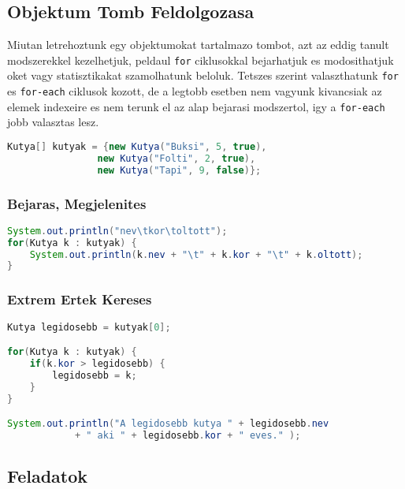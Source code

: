 \documentclass{article}
\let\l\lstinline
\begin{document}
\newpage

\subsection{Objektum Tomb Feldolgozasa}

Miutan letrehoztunk egy objektumokat tartalmazo tombot, azt az eddig tanult modszerekkel kezelhetjuk, peldaul \l{for}
ciklusokkal bejarhatjuk es modosithatjuk oket vagy statisztikakat szamolhatunk beloluk. Tetszes szerint valaszthatunk
\l{for} es \l{for-each} ciklusok kozott, de a legtobb esetben nem vagyunk kivancsiak az elemek indexeire es nem
terunk el az alap bejarasi modszertol, igy a \l{for-each} jobb  valasztas lesz.

\begin{lstlisting}[language=Java, caption=A kutya tomb amivel dolgozni fogunk a kovetkezo peldakban]
Kutya[] kutyak = {new Kutya("Buksi", 5, true),
                new Kutya("Folti", 2, true),
                new Kutya("Tapi", 9, false)};
\end{lstlisting}

\subsubsection{Bejaras, Megjelenites}

\begin{lstlisting}[language=Java, caption=Kutyak adatainak megjelenitese]
System.out.println("nev\tkor\toltott");
for(Kutya k : kutyak) {
    System.out.println(k.nev + "\t" + k.kor + "\t" + k.oltott);
}
\end{lstlisting}

\subsubsection{Extrem Ertek Kereses}

\begin{lstlisting}[language=Java, caption=Legidosebb kutya megkeresese]
Kutya legidosebb = kutyak[0];

for(Kutya k : kutyak) {
    if(k.kor > legidosebb) {
        legidosebb = k;
    }
}

System.out.println("A legidosebb kutya " + legidosebb.nev
            + " aki " + legidosebb.kor + " eves." );
\end{lstlisting}

\newpage

\subsection{Feladatok}
\end{document}
